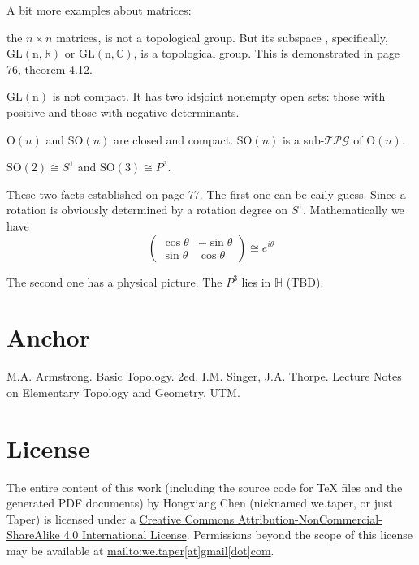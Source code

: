 \documentclass{article}
\begin{document}
A bit more examples about matrices:
\begin{ex}
     the $n\times n$ matrices, is not a
    topological group. But its subspace
    , specifically,
    $\mathrm{GL(n,\mathbb{R})}$ or $\mathrm{GL(n,\mathbb{C})}$, is a
    topological group. This is demonstrated in page 76, theorem 4.12.
\end{ex}
\begin{fact}
    $\mathrm{GL(n)}$ is not compact. It has two idsjoint nonempty open
    sets: those with positive and those with negative determinants.
\end{fact}
\begin{thm}
    $\mathrm{O}(n)$ and $\mathrm{SO}(n)$ are closed and compact.
    $\mathrm{SO}(n)$ is a sub-$\mathcal{TPG}$ of $\mathrm{O}(n)$.
\end{thm}
\begin{fact}
    $\mathrm{SO}(2)\cong S^1$ and $\mathrm{SO}(3)\cong P^3$.
\end{fact}
\begin{remark}
    These two facts established on page 77. The first one can be eaily
    guess. Since a rotation is obviously determined by a rotation
    degree on $S^1$. Mathematically we have
    \begin{equation}
        \left(\begin{array} {cc}
            \cos\theta & -\sin\theta \\
            \sin\theta & \cos\theta 
        \end{array}\right) \cong e^{i\theta}
    \end{equation}

    The second one has a physical picture. The $P^3$ lies in
    $\mathbb{H}$ (TBD). %
\end{remark}

\section{Anchor}
\label{sec:Anchor}

\begin{thebibliography}{1}
     M.A. Armstrong. Basic Topology. 2ed.
     I.M. Singer, J.A. Thorpe. Lecture Notes on
    Elementary Topology and Geometry. UTM.
\end{thebibliography}
\printnomenclature
\section{License}
The entire content of this work (including the source code
for TeX files and the generated PDF documents) by 
Hongxiang Chen (nicknamed we.taper, or just Taper) is
licensed under a 
\href{http://creativecommons.org/licenses/by-nc-sa/4.0/}{Creative 
Commons Attribution-NonCommercial-ShareAlike 4.0 International 
License}. Permissions beyond the scope of this 
license may be available at \url{mailto:we.taper[at]gmail[dot]com}.
\end{document}
